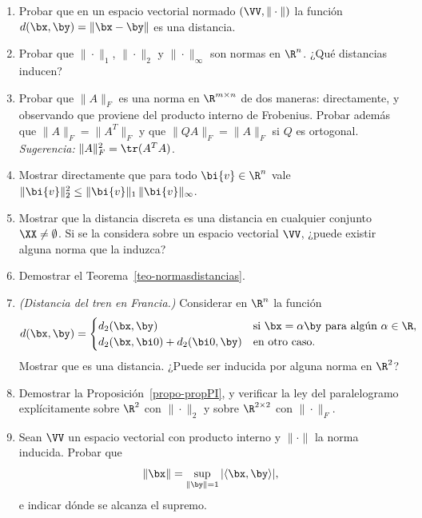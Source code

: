 \begin{enumerate}

\item\label{ejer-normadistancia} Probar que en un espacio vectorial normado
$(\VV,\|\cdot\|)$ la función $d(\bx,\by)=\|\bx-\by\|$ es una distancia.

\item Probar que $\|\cdot\|_1$, $\|\cdot\|_2$ y $\|\cdot\|_\infty$ son normas
en $\R^n$. ¿Qué distancias inducen?

\item Probar que $\|A\|_F$ es una norma en $\R^{m\times n}$ de dos maneras:
directamente, y observando que proviene del producto interno de Frobenius.
Probar además que $\|A\|_F=\|A^T\|_F$ y que $\|QA\|_F=\|A\|_F$ si $Q$ es
ortogonal. \emph{Sugerencia:} $\|A\|_F^2=\tr(A^TA)$.

\item Mostrar directamente que para todo $\bi{v}\in\R^n$ vale
$\|\bi{v}\|_2^2\le\|\bi{v}\|_1\,\|\bi{v}\|_\infty$.

\item Mostrar que la distancia discreta es una distancia en cualquier
conjunto $\XX\neq\emptyset$. Si se la considera sobre un espacio vectorial
$\VV$, ¿puede existir alguna norma que la induzca?

\item\label{ejer-teonormadistancia} Demostrar el
Teorema~\ref{teo-normasdistancias}.

\item \textit{(Distancia del tren en Francia.)} Considerar en $\R^n$ la
función
\[
d(\bx,\by)=\begin{cases}
  d_2(\bx,\by) & \text{si }\bx=\alpha\by\text{ para algún }\alpha\in\R,\\
  d_2(\bx,\bi 0)+d_2(\bi 0,\by)& \text{en otro caso}.
\end{cases}
\]
Mostrar que es una distancia. ¿Puede ser inducida por alguna norma en $\R^2$?

\item\label{ejer-polarizacion} Demostrar la
Proposición~\ref{propo-propPI}, y verificar la ley del paralelogramo
explícitamente sobre $\R^2$ con $\|\cdot\|_2$ y sobre $\R^{2\times2}$ con
$\|\cdot\|_F$.

\item Sean $\VV$ un espacio vectorial con producto interno y $\|\cdot\|$ la
norma inducida. Probar que
\[
\|\bx\|=\sup_{\|\by\|=1}|\langle\bx,\by\rangle| ,
\]
e indicar dónde se alcanza el supremo.


\end{enumerate}

